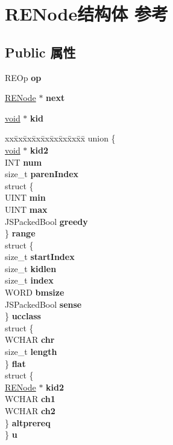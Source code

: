 \hypertarget{struct_r_e_node}{}\section{R\+E\+Node结构体 参考}
\label{struct_r_e_node}
\subsection*{Public 属性}
\begin{DoxyCompactItemize}
\item 
\mbox{\label{struct_r_e_node_a14b894a6a7d13a410403be9d4f4d9af0}} 
R\+E\+Op {\bfseries op}
\item 
\mbox{\label{struct_r_e_node_a2810a43e316f2930649f3244012d27a9}} 
\hyperlink{struct_r_e_node}{R\+E\+Node} $\ast$ {\bfseries next}
\item 
\mbox{\label{struct_r_e_node_a92c2f52dfca7ed99a3794110f24e0457}} 
\hyperlink{interfacevoid}{void} $\ast$ {\bfseries kid}
\item 
\mbox{\label{struct_r_e_node_a308fed92694e6c9c9b616897b929d7f2}} 
\begin{tabbing}
xx\=xx\=xx\=xx\=xx\=xx\=xx\=xx\=xx\=\kill
union \{\\
\>\hyperlink{interfacevoid}{void} $\ast$ {\bfseries kid2}\\
\>INT {\bfseries num}\\
\>size\_t {\bfseries parenIndex}\\
\>struct \{\\
\>\>UINT {\bfseries min}\\
\>\>UINT {\bfseries max}\\
\>\>JSPackedBool {\bfseries greedy}\\
\>\} {\bfseries range}\\
\>struct \{\\
\>\>size\_t {\bfseries startIndex}\\
\>\>size\_t {\bfseries kidlen}\\
\>\>size\_t {\bfseries index}\\
\>\>WORD {\bfseries bmsize}\\
\>\>JSPackedBool {\bfseries sense}\\
\>\} {\bfseries ucclass}\\
\>struct \{\\
\>\>WCHAR {\bfseries chr}\\
\>\>size\_t {\bfseries length}\\
\>\} {\bfseries flat}\\
\>struct \{\\
\>\>\hyperlink{struct_r_e_node}{RENode} $\ast$ {\bfseries kid2}\\
\>\>WCHAR {\bfseries ch1}\\
\>\>WCHAR {\bfseries ch2}\\
\>\} {\bfseries altprereq}\\
\} {\bfseries u}\\


\end{tabbing}
\end{DoxyCompactItemize}

